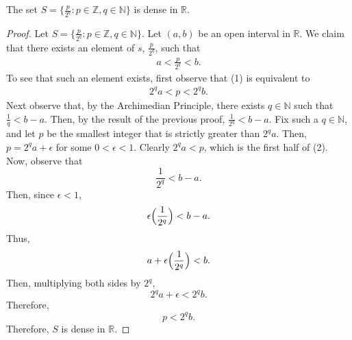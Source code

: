 \documentclass[12pt]{article}
\begin{document}
\newpage
{} The set $S = \{\frac p {2^q} : p \in \mathbb Z, q \in \mathbb N\}$ is dense in $\mathbb R$.

\begin{proof}
    Let $S = \{\frac p {2^q} : p \in \mathbb Z, q \in \mathbb N\}$. Let $(a,b)$ be an open interval in $\mathbb R$. We claim that there exists an element of $s$, $\frac{p}{2^q}$, such that
    \begin{align}
        a < \frac{p}{2^q} < b.
    \end{align}
    To see that such an element exists, first observe that (1) is equivalent to
    \begin{align}
        2^qa < p < 2^qb.
    \end{align}
    Next observe that, by the Archimedian Principle, there exists $q \in \mathbb N$ such that $\frac1q < b - a$. Then, by the result of the previous proof, $\frac1{2^q} < b - a$. Fix such a $q \in \mathbb N$, and let $p$ be the smallest integer that is strictly greater than $2^qa$. Then, $p = 2^qa + \epsilon$ for some $0 < \epsilon < 1$. Clearly $2^qa < p$, which is the first half of (2).
    Now, observe that $$\frac{1}{2^q} < b - a.$$
    Then, since $\epsilon < 1$, $$\epsilon\Big{(}\frac{1}{2^q}\Big{)} < b - a.$$
    Thus, $$a + \epsilon\Big{(}\frac{1}{2^q}\Big{)} < b.$$
    Then, multiplying both sides by $2^q$, $$2^qa + \epsilon < 2^qb.$$
    Therefore, $$p < 2^qb.$$
    Therefore, $S$ is dense in $\mathbb R$.
    
    
\end{proof}
\end{document}
